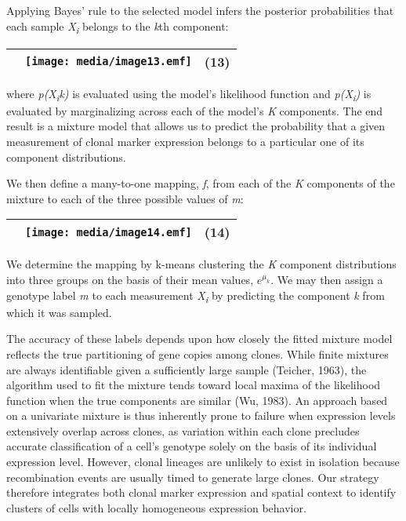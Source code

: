 Applying Bayes' rule to the selected model infers the posterior probabilities that each sample \emph{X\textsubscript{i}} belongs to the \emph{k}th component:

\begin{longtable}[]{@{}lll@{}}
\toprule
& \texttt{[image: media/image13.emf]} & (13)\tabularnewline
\bottomrule
\end{longtable}

where \emph{p(X\textsubscript{i}\textbar{}k)} is evaluated using the model's likelihood function and \emph{p(X\textsubscript{i})} is evaluated by marginalizing across each of the model's \emph{K} components. The end result is a mixture model that allows us to predict the probability that a given measurement of clonal marker expression belongs to a particular one of its component distributions.

We then define a many-to-one mapping, \emph{f}, from each of the \emph{K} components of the mixture to each of the three possible values of \emph{m}:

\begin{longtable}[]{@{}lll@{}}
\toprule
& \texttt{[image: media/image14.emf]} & (14)\tabularnewline
\bottomrule
\end{longtable}

We determine the mapping by k-means clustering the \emph{K} component distributions into three groups on the basis of their mean values, \(e^{\mu_{k}}\). We may then assign a genotype label \emph{m} to each measurement \emph{X\textsubscript{i}} by predicting the component \emph{k} from which it was sampled.

The accuracy of these labels depends upon how closely the fitted mixture model reflects the true partitioning of gene copies among clones. While finite mixtures are always identifiable given a sufficiently large sample (Teicher, 1963), the algorithm used to fit the mixture tends toward local maxima of the likelihood function when the true components are similar (Wu, 1983). An approach based on a univariate mixture is thus inherently prone to failure when expression levels extensively overlap across clones, as variation within each clone precludes accurate classification of a cell's genotype solely on the basis of its individual expression level. However, clonal lineages are unlikely to exist in isolation because recombination events are usually timed to generate large clones. Our strategy therefore integrates both clonal marker expression and spatial context to identify clusters of cells with locally homogeneous expression behavior.


